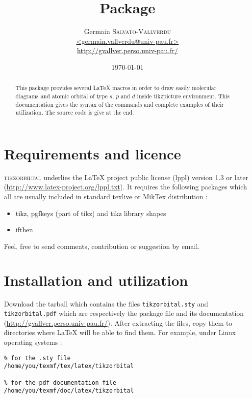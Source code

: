 \documentclass[10pt]{article}
\title{\package Package}
\author{Germain \textsc{Salvato-Vallverdu} \\ \url{<germain.vallverdu@univ-pau.fr>}\\\url{http://gvallver.perso.univ-pau.fr/}}
\date{\today}
\newcommand{\package}{\textsc{\sffamily\color{blue!50!black}tikzorbiltal}\xspace}
\begin{document}

\maketitle

\begin{abstract}
    This package provides several \LaTeX{} macros in order to draw easily molecular diagrams and atomic orbital of type $s$, $p$ and $d$ inside tikzpicture environment. This documentation gives the syntax of the commands and complete examples of their utilization. The source code is give at the end.
\end{abstract}

{\singlespacing
\tableofcontents
}

\section{Requirements and licence}

\package underlies the \LaTeX{} project public license (lppl) version 1.3 or later (\url{http://www.latex-project.org/lppl.txt}). It requires the following packages which all are usually included in standard texlive or MikTex distribution :

\begin{itemize}
    \item tikz, pgfkeys (part of tikz) and tikz library shapes
    \item ifthen
\end{itemize}

Feel, free to send comments, contribution or suggestion by email.

\section{Installation and utilization}

Download the tarball which contains the files \verb!tikzorbital.sty! and \verb!tikzorbital.pdf! which are respectively the package file and its documentation (\url{http://gvallver.perso.univ-pau.fr/}). After extracting the files, copy them to directories where \LaTeX{} will be able to find them. For example, under Linux operating systems :

\begin{lstlisting}
% for the .sty file
/home/you/texmf/tex/latex/tikzorbital

% for the pdf documentation file
/home/you/texmf/doc/latex/tikzorbital
\end{lstlisting}
\end{document}
